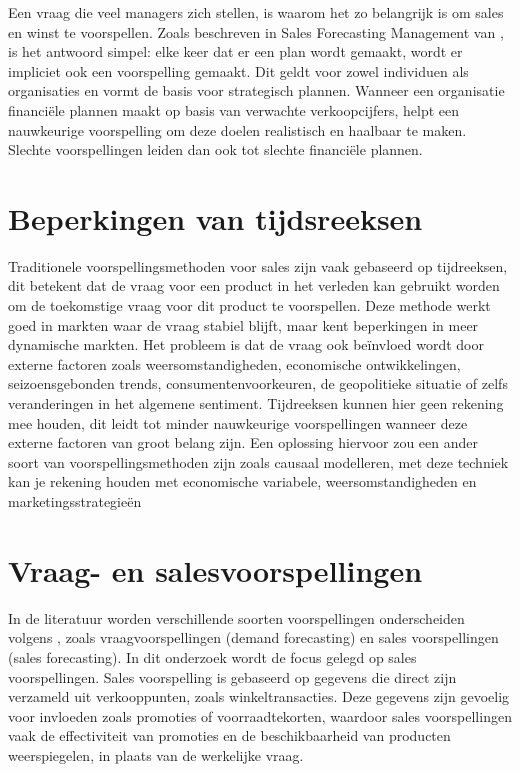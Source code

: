 Een vraag die veel managers zich stellen, is waarom het zo belangrijk is om sales en winst te voorspellen. Zoals beschreven in Sales Forecasting Management van \textcite{JohnT.Mentzer2004}, is het antwoord simpel: elke keer dat er een plan wordt gemaakt, wordt er impliciet ook een voorspelling gemaakt. Dit geldt voor zowel individuen als organisaties en vormt de basis voor strategisch plannen. Wanneer een organisatie financiële plannen maakt op basis van verwachte verkoopcijfers, helpt een nauwkeurige voorspelling om deze doelen realistisch en haalbaar te maken. Slechte voorspellingen leiden dan ook tot slechte financiële plannen.


\section{Beperkingen van tijdsreeksen}  
Traditionele voorspellingsmethoden voor sales zijn vaak gebaseerd op tijdreeksen, dit betekent dat de vraag voor een product in het verleden kan gebruikt worden om de toekomstige vraag voor dit product te voorspellen. Deze methode werkt goed in markten waar de vraag stabiel blijft, maar kent beperkingen in meer dynamische markten. Het probleem is dat de vraag ook beïnvloed wordt door externe factoren zoals weersomstandigheden, economische ontwikkelingen, seizoensgebonden trends, consumentenvoorkeuren, de geopolitieke situatie of zelfs veranderingen in het algemene sentiment.
Tijdreeksen kunnen hier geen rekening mee houden, dit leidt tot minder nauwkeurige voorspellingen wanneer deze externe factoren van groot belang zijn. Een oplossing hiervoor zou een ander soort van voorspellingsmethoden zijn zoals causaal modelleren, met deze techniek kan je rekening houden met economische variabele, weersomstandigheden en marketingsstrategieën \autocite{UsugaCadavid2018}

\section{Vraag- en salesvoorspellingen}  
 

In de literatuur worden verschillende soorten voorspellingen onderscheiden volgens \textcite{UsugaCadavid2018}, zoals vraagvoorspellingen (demand forecasting) en sales voorspellingen (sales forecasting). In dit onderzoek wordt de focus gelegd op sales voorspellingen. Sales voorspelling is gebaseerd op gegevens die direct zijn verzameld uit verkooppunten, zoals winkeltransacties. Deze gegevens zijn gevoelig voor invloeden zoals promoties of voorraadtekorten, waardoor sales voorspellingen vaak de effectiviteit van promoties en de beschikbaarheid van producten weerspiegelen, in plaats van de werkelijke vraag.

